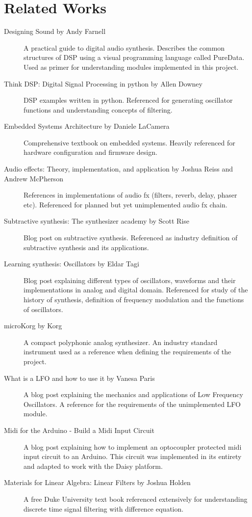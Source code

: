 \documentclass[acmlarge,screen]{acmart}
\begin{document}
\section{Related Works}
	\begin{description}
		\item[Designing Sound by Andy Farnell] A practical guide to digital audio synthesis. Describes the common structures of DSP using a visual programming language called PureData. Used as primer for understanding modules implemented in this project.
		\item[Think DSP: Digital Signal Processing in python by Allen Downey] DSP examples written in python. Referenced for generating oscillator functions and understanding concepts of filtering.
		\item[Embedded Systems Architecture by Daniele LaCamera] Comprehensive textbook on embedded systems. Heavily referenced for hardware configuration and firmware design.
		\item[Audio effects: Theory, implementation, and application by Joshua Reiss and Andrew McPherson] References in implementations of audio fx (filters, reverb, delay, phaser etc). Referenced for planned but yet unimplemented audio fx chain.
		\item[Subtractive synthesis: The synthesizer academy by Scott Rise] Blog post on subtractive synthesis. Referenced as industry definition of subtractive synthesis and its applications.
		\item[Learning synthesis: Oscillators by Eldar Tagi] Blog post explaining different types of oscillators, waveforms and their implementations in analog and digital domain. Referenced for study of the history of synthesis, definition of frequency modulation and the functions of oscillators.
		\item[microKorg by Korg] A compact polyphonic analog synthesizer. An industry standard instrument used as a reference when defining the requirements of the project.
		\item[What is a LFO and how to use it by Vanesa Paris] A blog post explaining the mechanics and applications of Low Frequency Oscillators. A reference for the requirements of the unimplemented LFO module.
		\item[Midi for the Arduino - Build a Midi Input Circuit] A blog post explaining how to implement an optocoupler protected midi input circuit to an Arduino. This circuit was implemented in its entirety and adapted to work with the Daisy platform.
		\item[Materials for Linear Algebra: Linear Filters by Joshua Holden] A free Duke University text book referenced extensively for understanding discrete time signal filtering with difference equation.

\end{description}
\end{document}
